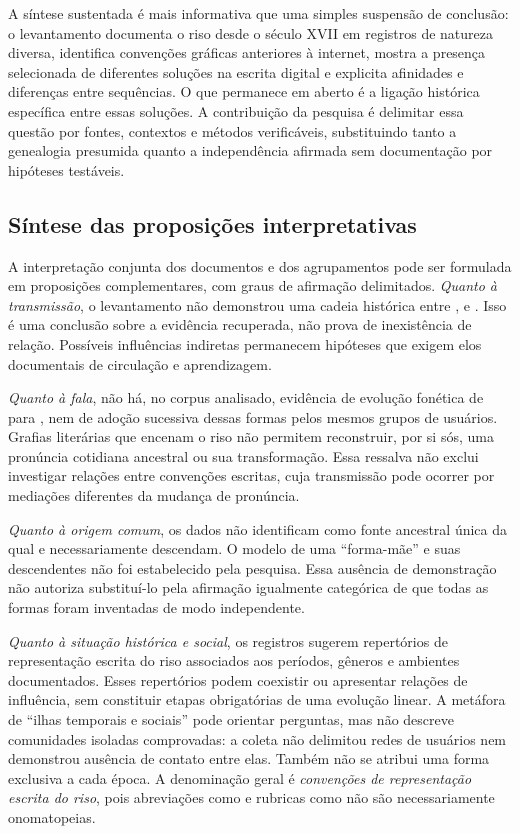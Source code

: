 A síntese sustentada é mais informativa que uma simples suspensão de conclusão: o levantamento documenta o riso desde o século XVII em registros de natureza diversa, identifica convenções gráficas anteriores à internet, mostra a presença selecionada de diferentes soluções na escrita digital e explicita afinidades e diferenças entre sequências. O que permanece em aberto é a ligação histórica específica entre essas soluções. A contribuição da pesquisa é delimitar essa questão por fontes, contextos e métodos verificáveis, substituindo tanto a genealogia presumida quanto a independência afirmada sem documentação por hipóteses testáveis.

\subsection{Síntese das proposições interpretativas}
\label{sec:interpretive-synthesis}

A interpretação conjunta dos documentos e dos agrupamentos pode ser formulada em proposições complementares, com graus de afirmação delimitados. \emph{Quanto à transmissão}, o levantamento não demonstrou uma cadeia histórica entre ,  e . Isso é uma conclusão sobre a evidência recuperada, não prova de inexistência de relação. Possíveis influências indiretas permanecem hipóteses que exigem elos documentais de circulação e aprendizagem.

\emph{Quanto à fala}, não há, no corpus analisado, evidência de evolução fonética de  para , nem de adoção sucessiva dessas formas pelos mesmos grupos de usuários. Grafias literárias que encenam o riso não permitem reconstruir, por si sós, uma pronúncia cotidiana ancestral ou sua transformação. Essa ressalva não exclui investigar relações entre convenções escritas, cuja transmissão pode ocorrer por mediações diferentes da mudança de pronúncia.

\emph{Quanto à origem comum}, os dados não identificam  como fonte ancestral única da qual  e  necessariamente descendam. O modelo de uma ``forma-mãe'' e suas descendentes não foi estabelecido pela pesquisa. Essa ausência de demonstração não autoriza substituí-lo pela afirmação igualmente categórica de que todas as formas foram inventadas de modo independente.

\emph{Quanto à situação histórica e social}, os registros sugerem repertórios de representação escrita do riso associados aos períodos, gêneros e ambientes documentados. Esses repertórios podem coexistir ou apresentar relações de influência, sem constituir etapas obrigatórias de uma evolução linear. A metáfora de ``ilhas temporais e sociais'' pode orientar perguntas, mas não descreve comunidades isoladas comprovadas: a coleta não delimitou redes de usuários nem demonstrou ausência de contato entre elas. Também não se atribui uma forma exclusiva a cada época. A denominação geral é \emph{convenções de representação escrita do riso}, pois abreviações como  e rubricas como  não são necessariamente onomatopeias.

